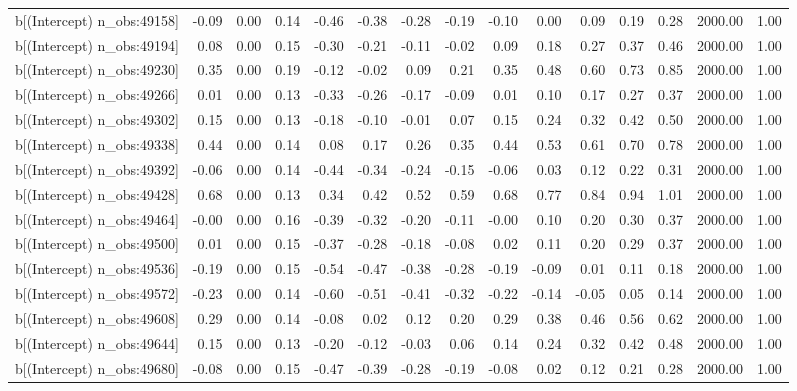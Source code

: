 \begin{table}[ht]
\begin{tabular}{rrrrrrrrrrrrrrr}
  b[(Intercept) n\_obs:49158] & -0.09 & 0.00 & 0.14 & -0.46 & -0.38 & -0.28 & -0.19 & -0.10 & 0.00 & 0.09 & 0.19 & 0.28 & 2000.00 & 1.00 \\ 
  b[(Intercept) n\_obs:49194] & 0.08 & 0.00 & 0.15 & -0.30 & -0.21 & -0.11 & -0.02 & 0.09 & 0.18 & 0.27 & 0.37 & 0.46 & 2000.00 & 1.00 \\ 
  b[(Intercept) n\_obs:49230] & 0.35 & 0.00 & 0.19 & -0.12 & -0.02 & 0.09 & 0.21 & 0.35 & 0.48 & 0.60 & 0.73 & 0.85 & 2000.00 & 1.00 \\ 
  b[(Intercept) n\_obs:49266] & 0.01 & 0.00 & 0.13 & -0.33 & -0.26 & -0.17 & -0.09 & 0.01 & 0.10 & 0.17 & 0.27 & 0.37 & 2000.00 & 1.00 \\ 
  b[(Intercept) n\_obs:49302] & 0.15 & 0.00 & 0.13 & -0.18 & -0.10 & -0.01 & 0.07 & 0.15 & 0.24 & 0.32 & 0.42 & 0.50 & 2000.00 & 1.00 \\ 
  b[(Intercept) n\_obs:49338] & 0.44 & 0.00 & 0.14 & 0.08 & 0.17 & 0.26 & 0.35 & 0.44 & 0.53 & 0.61 & 0.70 & 0.78 & 2000.00 & 1.00 \\ 
  b[(Intercept) n\_obs:49392] & -0.06 & 0.00 & 0.14 & -0.44 & -0.34 & -0.24 & -0.15 & -0.06 & 0.03 & 0.12 & 0.22 & 0.31 & 2000.00 & 1.00 \\ 
  b[(Intercept) n\_obs:49428] & 0.68 & 0.00 & 0.13 & 0.34 & 0.42 & 0.52 & 0.59 & 0.68 & 0.77 & 0.84 & 0.94 & 1.01 & 2000.00 & 1.00 \\ 
  b[(Intercept) n\_obs:49464] & -0.00 & 0.00 & 0.16 & -0.39 & -0.32 & -0.20 & -0.11 & -0.00 & 0.10 & 0.20 & 0.30 & 0.37 & 2000.00 & 1.00 \\ 
  b[(Intercept) n\_obs:49500] & 0.01 & 0.00 & 0.15 & -0.37 & -0.28 & -0.18 & -0.08 & 0.02 & 0.11 & 0.20 & 0.29 & 0.37 & 2000.00 & 1.00 \\ 
  b[(Intercept) n\_obs:49536] & -0.19 & 0.00 & 0.15 & -0.54 & -0.47 & -0.38 & -0.28 & -0.19 & -0.09 & 0.01 & 0.11 & 0.18 & 2000.00 & 1.00 \\ 
  b[(Intercept) n\_obs:49572] & -0.23 & 0.00 & 0.14 & -0.60 & -0.51 & -0.41 & -0.32 & -0.22 & -0.14 & -0.05 & 0.05 & 0.14 & 2000.00 & 1.00 \\ 
  b[(Intercept) n\_obs:49608] & 0.29 & 0.00 & 0.14 & -0.08 & 0.02 & 0.12 & 0.20 & 0.29 & 0.38 & 0.46 & 0.56 & 0.62 & 2000.00 & 1.00 \\ 
  b[(Intercept) n\_obs:49644] & 0.15 & 0.00 & 0.13 & -0.20 & -0.12 & -0.03 & 0.06 & 0.14 & 0.24 & 0.32 & 0.42 & 0.48 & 2000.00 & 1.00 \\ 
  b[(Intercept) n\_obs:49680] & -0.08 & 0.00 & 0.15 & -0.47 & -0.39 & -0.28 & -0.19 & -0.08 & 0.02 & 0.12 & 0.21 & 0.28 & 2000.00 & 1.00 \\ 

\end{tabular}
\end{table}
